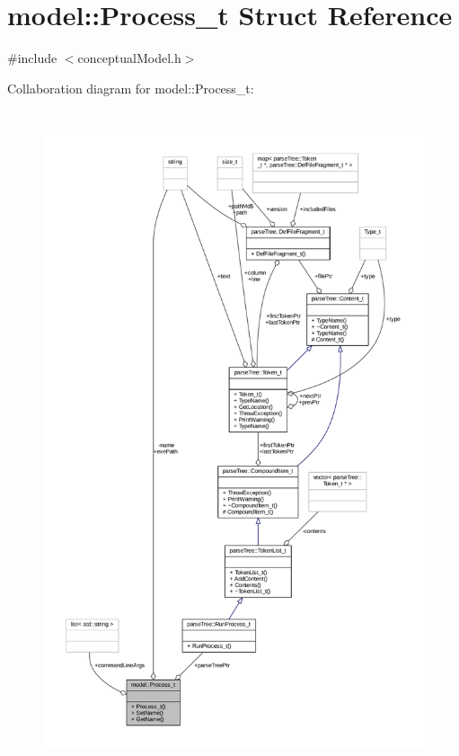 \hypertarget{structmodel_1_1_process__t}{}\section{model\+:\+:Process\+\_\+t Struct Reference}
\label{structmodel_1_1_process__t}


{\ttfamily \#include $<$conceptual\+Model.\+h$>$}



Collaboration diagram for model\+:\+:Process\+\_\+t\+:
\nopagebreak
\begin{figure}[H]
\begin{center}
\leavevmode
\includegraphics[height=550pt]{structmodel_1_1_process__t__coll__graph}
\end{center}
\end{figure}

